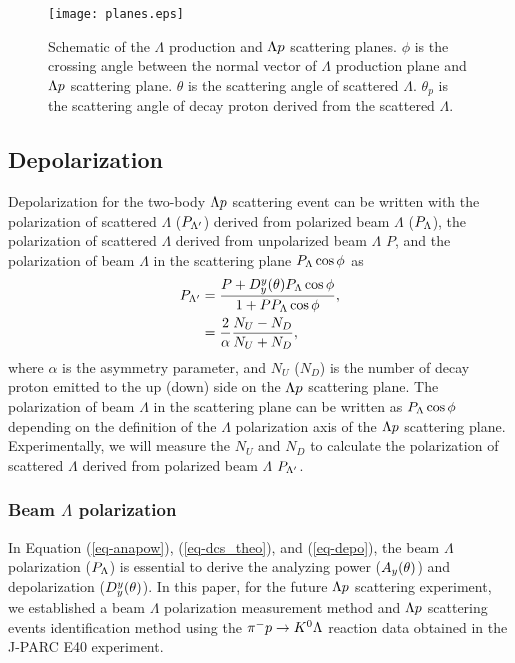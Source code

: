 \begin{figure}[h!]
 \begin{center}
   \texttt{[image: planes.eps]}
   \caption{Schematic of the $\Lambda$ production and $\Lambda p$ scattering planes. $\phi$ is the crossing angle between the normal vector of $\Lambda$ production plane and $\Lambda p$ scattering plane. $\theta$ is the scattering angle of scattered $\Lambda$. $\theta_{p}$ is the scattering angle of decay proton derived from the scattered $\Lambda$.}
   \label{fig-planes}
 \end{center}
\end{figure}

\subsection{Depolarization}
\label{sec-depo}

Depolarization for the two-body $\Lambda p$ scattering event can be written with the polarization of scattered $\Lambda$ ($P_{\Lambda'}$) derived from polarized beam $\Lambda$ ($P_{\Lambda}$), the polarization of scattered $\Lambda$ derived from unpolarized beam $\Lambda$ $P$, and the polarization of beam $\Lambda$ in the scattering plane $P_{\Lambda}\cos{\phi}$ as
\begin{align}
  P_{\Lambda'} &= \frac{P+D^{y}_{y}(\theta)P_{\Lambda}\cos{\phi}}{1+PP_{\Lambda}\cos{\phi}}, \\
  &= \frac{2}{\alpha} \frac{N_{U}-N_{D}}{N_{U}+N_{D}},
  \label{eq-depo}
\end{align}
where $\alpha$ is the asymmetry parameter, and $N_{U}$ ($N_{D}$) is the number of decay proton emitted to the up (down) side on the $\Lambda p$ scattering plane. The polarization of beam $\Lambda$ in the scattering plane can be written as $P_{\Lambda}\cos{\phi}$ depending on the definition of the $\Lambda$ polarization axis of the $\Lambda p$ scattering plane. Experimentally, we will measure the $N_{U}$ and $N_{D}$ to calculate the polarization of scattered $\Lambda$ derived from polarized beam $\Lambda$ $P_{\Lambda'}$. 

\subsubsection{Beam $\Lambda$ polarization}
In Equation (\ref{eq-anapow}), (\ref{eq-dcs_theo}), and (\ref{eq-depo}), the beam $\Lambda$ polarization ($P_{\Lambda}$) is essential to derive the analyzing power ($A_{y}(\theta)$) and depolarization ($D^{y}_{y}(\theta)$). In this paper, for the future $\Lambda p$ scattering experiment, we established a beam $\Lambda$ polarization measurement method and $\Lambda p$ scattering events identification method using the $\pi^- p \to K^0 \Lambda$ reaction data obtained in the J-PARC E40 experiment.


